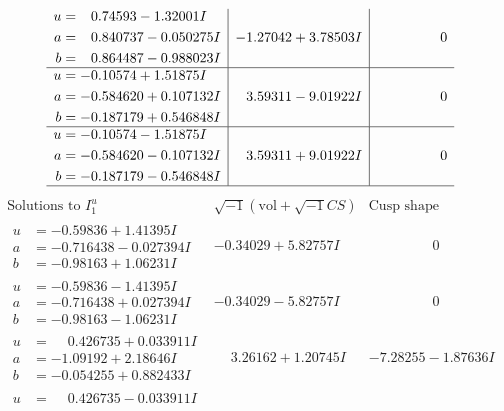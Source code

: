 \documentclass[1p]{elsarticle_modified}
\theoremstyle{definition}
\newcommand{\I}{\sqrt{-1}}
\begin{document}
$$\begin{array}{c|c|c}
\begin{aligned}
u &= \phantom{-}0.74593 - 1.32001 I \\
a &= \phantom{-}0.840737 - 0.050275 I \\
b &= \phantom{-}0.864487 - 0.988023 I\end{aligned}
 & -1.27042 + 3.78503 I & \phantom{-0.000000 } 0 \\ \hline\begin{aligned}
u &= -0.10574 + 1.51875 I \\
a &= -0.584620 + 0.107132 I \\
b &= -0.187179 + 0.546848 I\end{aligned}
 & \phantom{-}3.59311 - 9.01922 I & \phantom{-0.000000 } 0 \\ \hline\begin{aligned}
u &= -0.10574 - 1.51875 I \\
a &= -0.584620 - 0.107132 I \\
b &= -0.187179 - 0.546848 I\end{aligned}
 & \phantom{-}3.59311 + 9.01922 I & \phantom{-0.000000 } 0\\
 \hline 
 \end{array}$$\newpage$$\begin{array}{c|c|c}  
\text{Solutions to }I^u_{1}& \I (\text{vol} + \sqrt{-1}CS) & \text{Cusp shape}\\
 \hline 
\begin{aligned}
u &= -0.59836 + 1.41395 I \\
a &= -0.716438 - 0.027394 I \\
b &= -0.98163 + 1.06231 I\end{aligned}
 & -0.34029 + 5.82757 I & \phantom{-0.000000 } 0 \\ \hline\begin{aligned}
u &= -0.59836 - 1.41395 I \\
a &= -0.716438 + 0.027394 I \\
b &= -0.98163 - 1.06231 I\end{aligned}
 & -0.34029 - 5.82757 I & \phantom{-0.000000 } 0 \\ \hline\begin{aligned}
u &= \phantom{-}0.426735 + 0.033911 I \\
a &= -1.09192 + 2.18646 I \\
b &= -0.054255 + 0.882433 I\end{aligned}
 & \phantom{-}3.26162 + 1.20745 I & -7.28255 - 1.87636 I \\ \hline\begin{aligned}
u &= \phantom{-}0.426735 - 0.033911 I \\

\end{aligned}
\end{array}$$
\end{document}

